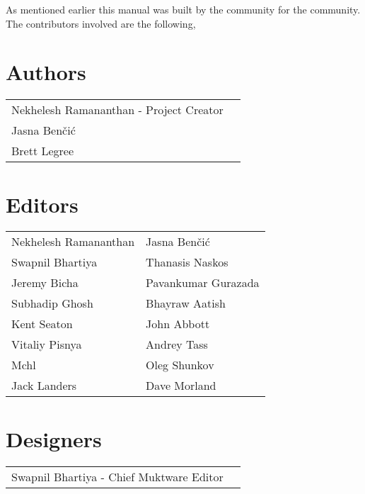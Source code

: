 As mentioned earlier this manual was built by the community for the community. The contributors involved are the following,

\section*{Authors} 
\begin{table}[ht!]
	\begin{tabular}{p{7cm} p{7cm}}
	Nekhelesh Ramananthan - Project Creator	&  \\
	Jasna Ben\v{c}i\'{c} 													&  \\
	Brett Legree 																& \\
	\end{tabular}
\end{table}

\section*{Editors}
\begin{table}[ht!]
	\begin{tabular}{p{7cm} p{7cm}}
	Nekhelesh Ramananthan 	& Jasna Ben\v{c}i\'{c} \\
	Swapnil Bhartiya 		& Thanasis Naskos \\	
	Jeremy Bicha			& Pavankumar Gurazada\\
	Subhadip Ghosh			& Bhayraw Aatish\\
	Kent Seaton				& John Abbott \\
	Vitaliy Pisnya			& Andrey Tass \\
	Mchl					& Oleg Shunkov \\
	Jack Landers			& Dave Morland \\
	\end{tabular}
\end{table}

\section*{Designers}
\begin{table}[ht!]
	\begin{tabular}{p{7cm} p{7cm}}
	Swapnil Bhartiya - Chief Muktware Editor & \\
	\end{tabular}
\end{table}